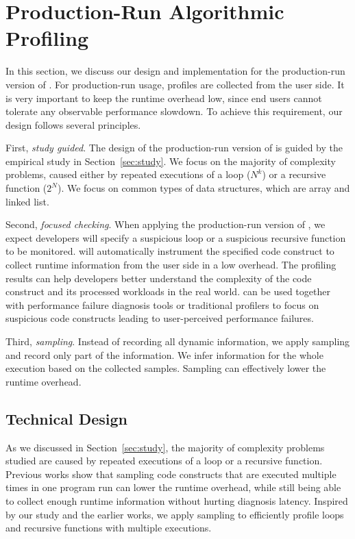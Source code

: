 \section{Production-Run Algorithmic Profiling}
\label{sec:online}

In this section, we discuss our design and 
implementation for the production-run version of \Tool. 
For production-run usage, profiles are collected from the user side.
It is very important to keep the runtime overhead low, since
end users cannot tolerate any observable performance slowdown.
To achieve this requirement,
our design follows several principles. 

First, \textit{study guided}. 
The design of the production-run version of \Tool
is guided by the empirical study in Section~\ref{sec:study}.
We focus on the majority of complexity problems, 
caused either by repeated executions of a loop ($N^k$)
or a recursive function ($2^N$).
We focus on common types of data structures, which are array and linked list.

Second, \textit{focused checking}.
When applying the production-run version of \Tool, 
we expect developers will specify a suspicious loop or a suspicious recursive function
to be monitored. 
\Tool will automatically instrument the specified code construct 
to collect runtime information from the user side in a low overhead. 
The profiling results can help developers better understand the complexity of the code construct 
and its processed workloads in the real world.
\Tool can be used together with performance failure 
diagnosis tools\cite{SongOOPSLA2014} 
or traditional profilers to
focus on suspicious code constructs leading 
to user-perceived performance failures.

Third, \textit{sampling}.
Instead of recording all dynamic information, 
we apply sampling and record only part of the information. 
We infer information for the whole execution based on the collected samples. 
Sampling can effectively lower the runtime overhead. 


\subsection{Technical Design}
As we discussed in Section~\ref{sec:study}, 
the majority of complexity problems studied are caused 
by repeated executions of a loop or a recursive function. 
Previous works show that sampling code constructs that are executed 
multiple times in one program run can lower the runtime overhead, 
while still being able to collect enough runtime information 
without hurting diagnosis latency\cite{SongOOPSLA2014,ldoctor}. 
Inspired by our study and the earlier works, 
we apply sampling to efficiently profile loops 
and recursive functions with multiple executions. 

